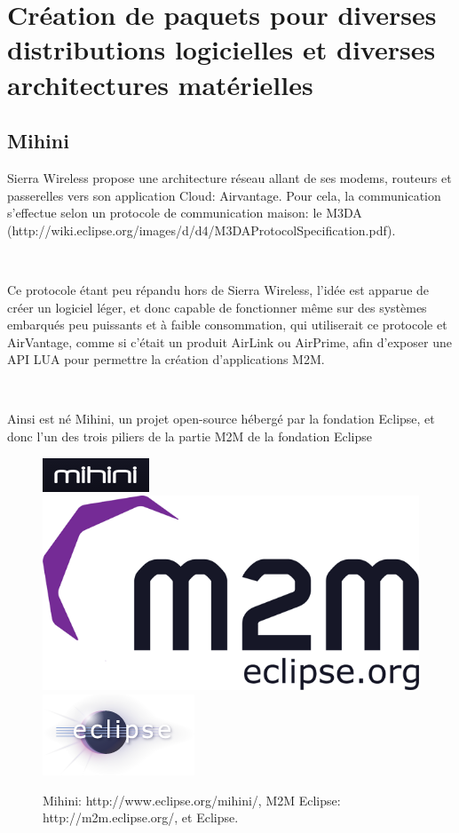 \documentclass{article}
\begin{document}
\clearpage

\section{Création de paquets pour diverses distributions logicielles et diverses architectures matérielles}
\subsection{Mihini}

Sierra Wireless propose une architecture réseau allant de ses modems, routeurs et passerelles vers son application Cloud: Airvantage.
Pour cela, la communication s’effectue selon un protocole de communication maison: le M3DA (http://wiki.eclipse.org/images/d/d4/M3DAProtocolSpecification.pdf).

~

Ce protocole étant peu répandu hors de Sierra Wireless, l’idée est apparue de créer un logiciel léger, et donc capable de fonctionner même sur des systèmes embarqués peu puissants et à faible consommation, qui utiliserait ce protocole et AirVantage, comme si c’était un produit AirLink ou AirPrime, afin d’exposer une API LUA pour permettre la création d’applications M2M.

~

Ainsi est né Mihini, un projet open-source hébergé par la fondation Eclipse, et donc l’un des trois piliers de la partie M2M de la fondation Eclipse

\begin{figure}[h!]
    \centering
    \includegraphics{img/mihini_logo.png}
    \includegraphics[width=\linewidth/3]{img/M2M.png}
    \includegraphics{img/eclipse.png}
    \caption{Mihini: http://www.eclipse.org/mihini/, M2M Eclipse: http://m2m.eclipse.org/, et Eclipse.}
\end{figure}
\end{document}
